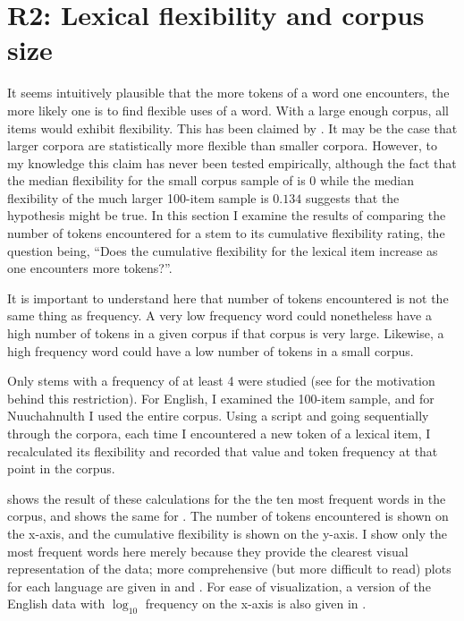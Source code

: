\section{R2: Lexical flexibility and corpus size}
\label{sec:4.4}

It seems intuitively plausible that the more tokens of a word one encounters, the more likely one is to find flexible uses of a word. With a large enough corpus, all items would exhibit flexibility. This has been claimed by \textcite[77]{MoselHovdhaugen1992}. It may be the case that larger corpora are statistically more flexible than smaller corpora. However, to my knowledge this claim has never been tested empirically, although the fact that the median flexibility for the small corpus sample of  is $0$ while the median flexibility of the much larger 100-item sample is $0.134$ suggests that the hypothesis might be true. In this section I examine the results of comparing the number of tokens encountered for a stem to its cumulative flexibility rating, the question being, \enquote{Does the cumulative flexibility for the lexical item increase as one encounters more tokens?}.

It is important to understand here that number of tokens encountered is not the same thing as frequency. A very low frequency word could nonetheless have a high number of tokens in a given corpus if that corpus is very large. Likewise, a high frequency word could have a low number of tokens in a small corpus.

Only stems with a frequency of at least 4 were studied (see  for the motivation behind this restriction). For English, I examined the 100-item sample, and for Nuuchahnulth I used the entire corpus. Using a script and going sequentially through the corpora, each time I encountered a new token of a lexical item, I recalculated its flexibility and recorded that value and token frequency at that point in the corpus.

 shows the result of these calculations for the the ten most frequent words in the  corpus, and  shows the same for . The number of tokens encountered is shown on the x-axis, and the cumulative flexibility is shown on the y-axis. I show only the most frequent words here merely because they provide the clearest visual representation of the data; more comprehensive (but more difficult to read) plots for each language are given in  and . For ease of visualization, a version of the English data with $\log_{10}$ frequency on the x-axis is also given in .

